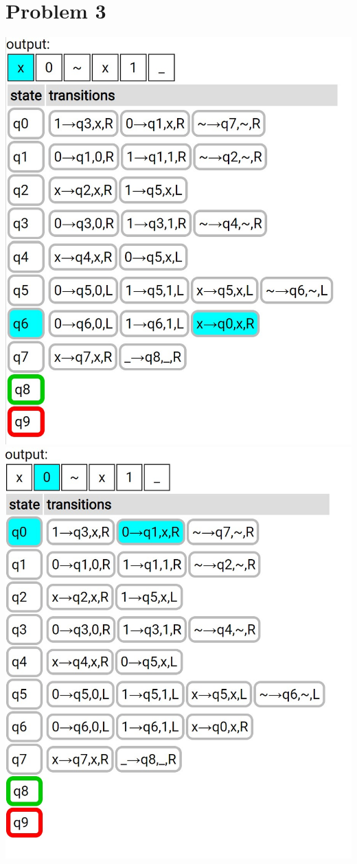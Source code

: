 \documentclass{article}
\newenvironment{problem}[1]{
  \nobreak\section*{Problem #1}
}{}
\begin{document}
\begin{problem}{3}
\begin{center}
      \includegraphics[scale=0.5]{images/6.jpg}
      \includegraphics[scale=0.5]{images/7.jpg}

\end{center}
\end{problem}
\end{document}
